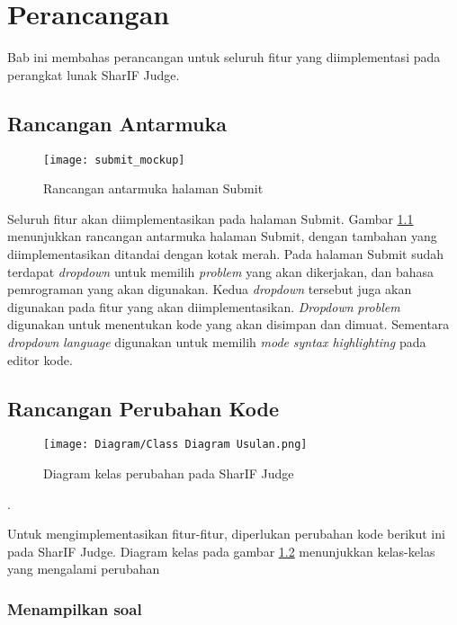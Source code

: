 \chapter{Perancangan}
\label{chap:perancangan}

Bab ini membahas perancangan untuk seluruh fitur yang diimplementasi pada  perangkat lunak SharIF Judge.

\section{Rancangan Antarmuka}
\label{sec:4:antarmuka}

\begin{figure}[H]
	\centering  
	\texttt{[image: submit\_mockup]}  
	\caption{Rancangan antarmuka halaman Submit} 
	\label{fig:4:antarmuka} 
\end{figure} 

Seluruh fitur akan diimplementasikan pada halaman Submit. Gambar \ref{fig:4:antarmuka} menunjukkan rancangan antarmuka halaman Submit, dengan tambahan yang diimplementasikan ditandai dengan kotak merah. Pada halaman Submit sudah terdapat \textit{dropdown} untuk memilih \textit{problem} yang akan dikerjakan, dan bahasa pemrograman yang akan digunakan. Kedua \textit{dropdown} tersebut juga akan digunakan pada fitur yang akan diimplementasikan. \textit{Dropdown} \textit{problem} digunakan untuk menentukan kode yang akan disimpan dan dimuat. Sementara \textit{dropdown} \textit{language} digunakan untuk memilih \textit{mode} \textit{syntax highlighting} pada editor kode.

\section{Rancangan Perubahan Kode}
\label{sec:4:kode}

\begin{figure}[H]
	\centering  
	\texttt{[image: Diagram/Class Diagram Usulan.png]}  
	\caption{Diagram kelas perubahan pada SharIF Judge \protect\footnotemark} 
	\label{fig:4:classdiagram} 
\end{figure} 
.

Untuk mengimplementasikan fitur-fitur, diperlukan perubahan kode berikut ini pada SharIF Judge. Diagram kelas pada gambar \ref{fig:4:classdiagram} menunjukkan kelas-kelas yang mengalami perubahan 

\subsection{Menampilkan soal}
\label{subsec:4:soal}

